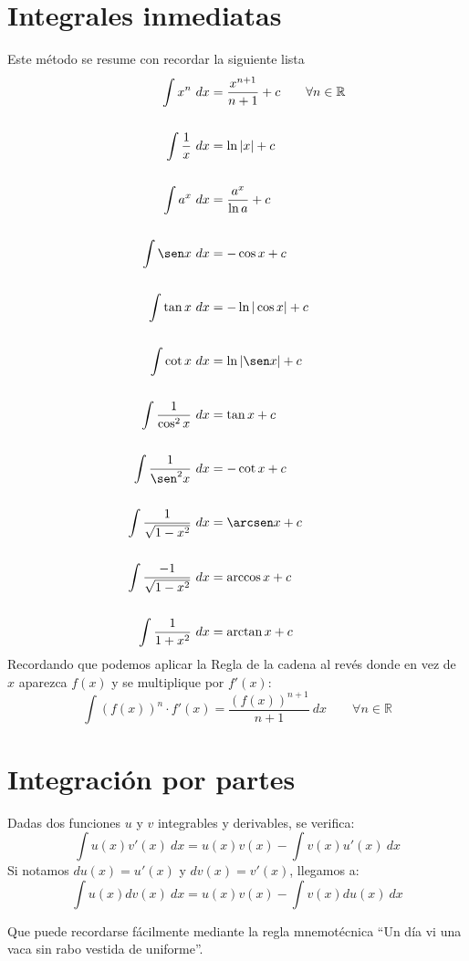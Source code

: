 \section{Integrales inmediatas}
Este método se resume con recordar la siguiente lista
\begin{align*}
        \displaystyle \int x^n~dx &= \frac{x^{n+1}}{n+1} + c \qquad \forall n\in \mathbb{R}\\\\
        \displaystyle \int \frac{1}{x}~dx &= \ln |x| + c \\\\
        \displaystyle\int a^x~dx  &= \dfrac{a^x}{\ln a} + c \\\\
        \displaystyle\int \sen x~dx  &= -\cos x + c \\\\
        \displaystyle\int \tan x~dx  &= -\ln |\cos x| + c \\\\
        \displaystyle\int \cot x~dx  &= \ln|\sen x| + c \\\\
        \displaystyle\int \frac{1}{\cos^2 x}~dx  &= \tan x + c \\\\
        \displaystyle\int \frac{1}{\sen^2 x}~dx &= -\cot x + c \\\\
        \displaystyle \int \frac{1}{\sqrt{1-x^2}}~dx  &= \arcsen x + c \\\\
        \displaystyle \int \frac{-1}{\sqrt{1-x^2}}~dx  &= \arccos x + c \\\\
        \displaystyle \int \frac{1}{1+x^2}~dx  &= \arctan x + c
\end{align*}
Recordando que podemos aplicar la Regla de la cadena al revés donde en vez de $x$ aparezca $f(x)$ y se multiplique por $f'(x)$:
\begin{equation*}
    \displaystyle\int {(f(x))}^n \cdot f'(x) = \frac{{(f(x))}^{n+1}}{n+1}~dx \qquad \forall n\in \mathbb{R}
\end{equation*}

\section{Integración por partes}
\begin{prop}
    Dadas dos funciones $u$ y $v$ integrables y derivables, se verifica:
    \begin{equation*}
        \displaystyle\int u(x) v'(x)~dx  = u(x)v(x) - \displaystyle\int v(x)u'(x)~dx 
    \end{equation*}
    Si notamos $du(x) = u'(x)$ y $dv(x) = v'(x)$, llegamos a:
    \begin{equation*}
        \displaystyle\int u(x)dv(x)~dx  = u(x)v(x) - \displaystyle\int v(x)du(x)~dx 
    \end{equation*}
\end{prop}
Que puede recordarse fácilmente mediante la regla mnemotécnica ``Un día vi una vaca sin rabo vestida de uniforme''.\\

